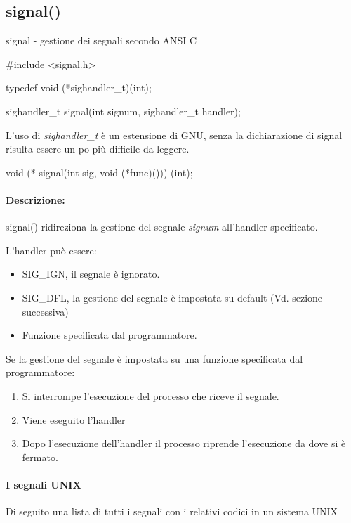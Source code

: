 \documentclass
[10pt,        %
 a4paper,     %
 onecolumn,   %
 fleqn,       %
 oneside,     %
 notitlepage, %
]{article}    %
\begin{document}
\subsection{signal()}
signal - gestione dei segnali secondo ANSI C
\begin{C}
#include <signal.h>

typedef void (*sighandler_t)(int);

sighandler_t signal(int signum, sighandler_t handler);
\end{C}

L'uso di \textit{sighandler\_t} è un estensione di GNU, senza la dichiarazione di signal risulta essere un po più difficile da leggere.

\begin{C}
void (* signal(int sig, void (*func)())) (int);
\end{C}

\paragraph{Descrizione:}
signal() ridireziona la gestione del segnale \textit{signum} all'handler specificato.

L'handler può essere:
\begin{itemize}
   \item SIG\_IGN, il segnale è ignorato.
   \item SIG\_DFL, la gestione del segnale è impostata su default (Vd. sezione successiva)
   \item Funzione specificata dal programmatore.
\end{itemize}

Se la gestione del segnale è impostata su una funzione specificata dal programmatore:
\begin{enumerate}
    \item Si interrompe l'esecuzione del processo che riceve il segnale.
    \item Viene eseguito l'handler
    \item Dopo l'esecuzione dell'handler il processo riprende l'esecuzione da dove si è fermato.
\end{enumerate}

\paragraph{I segnali UNIX}
Di seguito una lista di tutti i segnali con i relativi codici in un sistema UNIX

\end{document}
